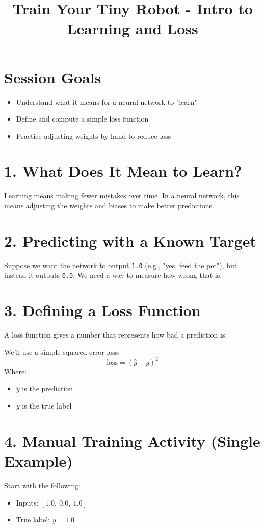 \documentclass{book}
\title{Train Your Tiny Robot - Intro to Learning and Loss}
\begin{document}
\maketitle

\section*{Session Goals}
\begin{itemize}
  \item Understand what it means for a neural network to "learn"
  \item Define and compute a simple loss function
  \item Practice adjusting weights by hand to reduce loss
\end{itemize}

\section*{1. What Does It Mean to Learn?}
Learning means making fewer mistakes over time. In a neural network, this means adjusting the weights and biases to make better predictions.

\section*{2. Predicting with a Known Target}
Suppose we want the network to output \texttt{1.0} (e.g., "yes, feed the pet"), but instead it outputs \texttt{0.0}. We need a way to measure how wrong that is.

\section*{3. Defining a Loss Function}
A loss function gives a number that represents how bad a prediction is.

We’ll use a simple squared error loss:
\[
\text{loss} = (\hat{y} - y)^2
\]
Where:
\begin{itemize}
  \item \( \hat{y} \) is the prediction
  \item \( y \) is the true label
\end{itemize}

\section*{4. Manual Training Activity (Single Example)}
Start with the following:
\begin{itemize}
  \item Inputs: \([1.0,\ 0.0,\ 1.0]\)
  \item True label: \( y = 1.0 \)
\end{itemize}
\end{document}
